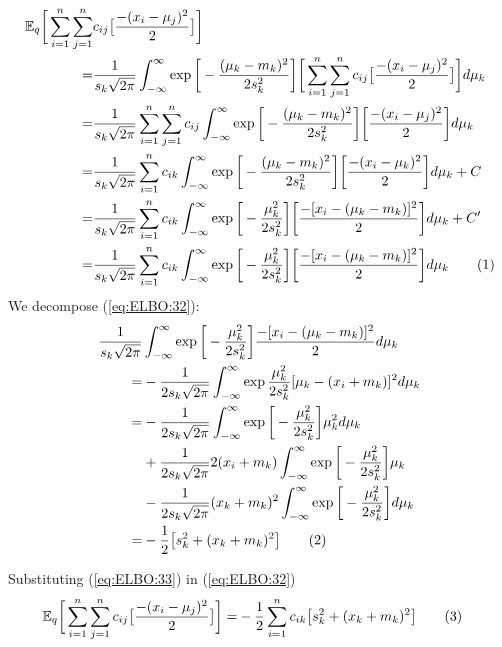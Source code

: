 \documentclass[]{article}
\newcommand{\Expectation} {\mathbb{E}}
\newcommand\numberthis    {\addtocounter{equation}{1}\tag{\theequation}}
\begin{document}
\begin{align*}
\Expectation_q\bigg[\sum_{i=1}^{n}\sum_{j=1}^{n}& c_{ij}\big[\frac{-(x_i-\mu_j)^2}{2}\big]\bigg]\\
=&\frac{1}{s_k\sqrt{2\pi}} \int_{-\infty}^{\infty} \exp{\bigg[-\frac{(\mu_k-m_k)^2}{2 s_k^2}\bigg]}\bigg[\sum_{i=1}^{n}\sum_{j=1}^{n} c_{ij}\big[\frac{-(x_i-\mu_j)^2}{2}\big]\bigg] d \mu_k\\
=&\frac{1}{s_k\sqrt{2\pi}} \sum_{i=1}^{n}\sum_{j=1}^{n} c_{ij} \int_{-\infty}^{\infty} \exp{\bigg[-\frac{(\mu_k-m_k)^2}{2 s_k^2}\bigg]}\bigg[\frac{-(x_i-\mu_j)^2}{2}\bigg] d \mu_k\\
=&\frac{1}{s_k\sqrt{2\pi}} \sum_{i=1}^{n} c_{ik} \int_{-\infty}^{\infty} \exp{\bigg[-\frac{(\mu_k-m_k)^2}{2 s_k^2}\bigg]}\bigg[\frac{-(x_i-\mu_k)^2}{2}\bigg] d \mu_k + C\\
=&\frac{1}{s_k\sqrt{2\pi}} \sum_{i=1}^{n} c_{ik} \int_{-\infty}^{\infty} \exp{\bigg[-\frac{\mu_k^2}{2 s_k^2}\bigg]}\bigg[\frac{-[x_i-(\mu_k-m_k)]^2}{2}\bigg] d \mu_k + C^\prime\\
=&\frac{1}{s_k\sqrt{2\pi}} \sum_{i=1}^{n} c_{ik} \int_{-\infty}^{\infty} \exp{\bigg[-\frac{\mu_k^2}{2 s_k^2}\bigg]}\bigg[\frac{-[x_i-(\mu_k-m_k)]^2}{2}\bigg] d \mu_k \numberthis \label{eq:ELBO:32}
\end{align*}
We decompose (\ref{eq:ELBO:32}): 
\begin{align*}
	\frac{1}{s_k\sqrt{2\pi}}& \int_{-\infty}^{\infty} \exp{\bigg[-\frac{\mu_k^2}{2 s_k^2}\bigg]} \frac{-[x_i-(\mu_k-m_k)]^2}{2} d \mu_k\\
	=&-\frac{1}{2 s_k\sqrt{2\pi}} \int_{-\infty}^{\infty} \exp{\frac{\mu_k^2}{2 s_k^2}}[\mu_k-(x_i+m_k)]^2 d \mu_k\\
	=& -\frac{1}{2s_k\sqrt{2\pi}} \int_{-\infty}^{\infty} \exp{\bigg[-\frac{\mu_k^2}{2 s_k^2}\bigg]} \mu_k^2 d\mu_k\\
	 &+ \frac{1}{2s_k\sqrt{2\pi}} 2(x_i+m_k) \int_{-\infty}^{\infty} \exp{\bigg[-\frac{\mu_k^2}{2 s_k^2}\bigg]} \mu_k\\
	 &-\frac{1}{2s_k\sqrt{2\pi}} (x_k+m_k)^2 \int_{-\infty}^{\infty} \exp{\bigg[-\frac{\mu_k^2}{2 s_k^2}\bigg]} d \mu_k\\
	 =& -\frac{1}{2} \big[s_k^2 + (x_k+m_k)^2 \big]\numberthis \label{eq:ELBO:33}
\end{align*}

Substituting (\ref{eq:ELBO:33}) in (\ref{eq:ELBO:32})
\begin{align*}
	\Expectation_q\bigg[\sum_{i=1}^{n}\sum_{j=1}^{n} c_{ij}\big[\frac{-(x_i-\mu_j)^2}{2}\big]\bigg]=& -\frac{1}{2} \sum_{i=1}^{n} c_{ik} \big[s_k^2 + (x_k+m_k)^2 \big] \numberthis \label{eq:ELBO:32F}
\end{align*}
\end{document}
